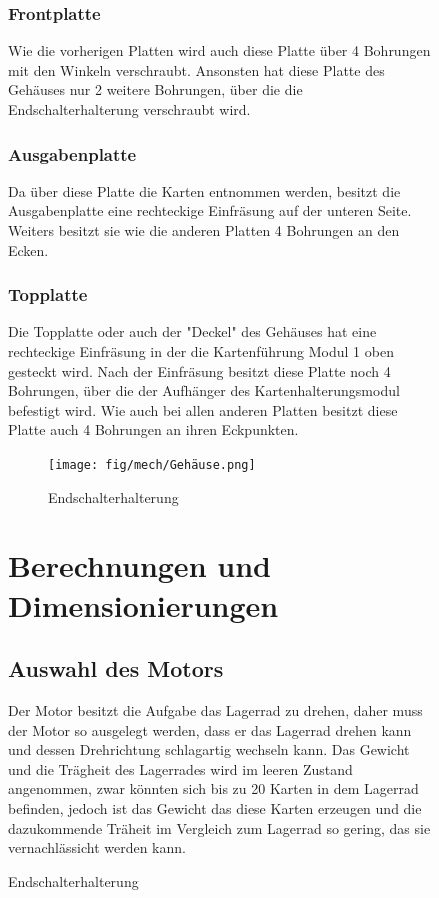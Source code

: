 \begin{figure}
\subsubsection{Frontplatte}
Wie die vorherigen Platten wird auch diese Platte über 4 Bohrungen mit den Winkeln verschraubt.
Ansonsten hat diese Platte des Gehäuses nur 2 weitere Bohrungen, über die die Endschalterhalterung verschraubt wird.

\subsubsection{Ausgabenplatte}
Da über diese Platte die Karten entnommen werden, besitzt die Ausgabenplatte eine rechteckige Einfräsung auf der unteren
Seite.
Weiters besitzt sie wie die anderen Platten 4 Bohrungen an den Ecken.

\subsubsection{Topplatte}
Die Topplatte oder auch der "Deckel" des Gehäuses hat eine rechteckige Einfräsung in der die Kartenführung Modul 1 oben
gesteckt wird. Nach der Einfräsung besitzt diese Platte noch 4 Bohrungen, über die der Aufhänger des Kartenhalterungsmodul
befestigt wird.
Wie auch bei allen anderen Platten besitzt diese Platte auch 4 Bohrungen an ihren Eckpunkten.

\begin{figure}
    \texttt{[image: fig/mech/Gehäuse.png]}
    \caption{Endschalterhalterung}
\end{figure}
\section{Berechnungen und Dimensionierungen}
\subsection{Auswahl des Motors}

Der Motor  besitzt die Aufgabe das Lagerrad zu drehen, daher muss der Motor so ausgelegt werden, dass
er das Lagerrad drehen kann und dessen Drehrichtung schlagartig wechseln kann. Das Gewicht und die Trägheit des
Lagerrades wird im leeren Zustand angenommen, zwar könnten sich bis zu 20 Karten in dem Lagerrad befinden,
jedoch ist das Gewicht das diese Karten erzeugen und die dazukommende Träheit im Vergleich zum Lagerrad
so gering, das sie vernachlässicht werden kann.


\end{figure}
